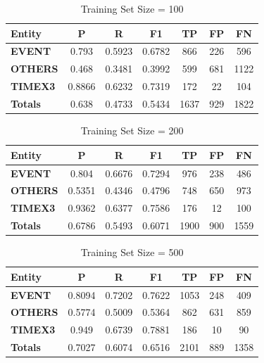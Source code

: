 \documentclass[letterpaper, 10 pt, conference]{ieeeconf}
\begin{document}
\begin{table}[!htpb]
\centering
\caption{Training Set Size = 100}
\label{t3}
\begin{tabular}{lcccccc}
\textbf{Entity} & \textbf{P} & \textbf{R} & \textbf{F1} & \textbf{TP} & \textbf{FP} & \textbf{FN} \\
\hline
\textbf{EVENT}  & 0.793      & 0.5923     & 0.6782      & 866         & 226         & 596         \\
\textbf{OTHERS} & 0.468      & 0.3481     & 0.3992      & 599         & 681         & 1122        \\
\textbf{TIMEX3} & 0.8866     & 0.6232     & 0.7319      & 172         & 22          & 104         \\
\textbf{Totals} & 0.638      & 0.4733     & 0.5434      & 1637        & 929         & 1822       
\end{tabular}
\end{table}

\begin{table}[!htpb]
\centering
\caption{Training Set Size = 200}
\label{t4}
\begin{tabular}{lcccccc}
\textbf{Entity} & \textbf{P} & \textbf{R} & \textbf{F1} & \textbf{TP} & \textbf{FP} & \textbf{FN} \\
\hline
\textbf{EVENT}  & 0.804      & 0.6676     & 0.7294      & 976         & 238         & 486         \\
\textbf{OTHERS} & 0.5351     & 0.4346     & 0.4796      & 748         & 650         & 973         \\
\textbf{TIMEX3} & 0.9362     & 0.6377     & 0.7586      & 176         & 12          & 100         \\
\textbf{Totals} & 0.6786     & 0.5493     & 0.6071      & 1900        & 900         & 1559       
\end{tabular}
\end{table}

\begin{table}[!htpb]
\centering
\caption{Training Set Size = 500}
\label{t5}
\begin{tabular}{lcccccc}
\textbf{Entity} & \textbf{P} & \textbf{R} & \textbf{F1} & \textbf{TP} & \textbf{FP} & \textbf{FN} \\
\hline
\textbf{EVENT}  & 0.8094     & 0.7202     & 0.7622      & 1053        & 248         & 409         \\
\textbf{OTHERS} & 0.5774     & 0.5009     & 0.5364      & 862         & 631         & 859         \\
\textbf{TIMEX3} & 0.949      & 0.6739     & 0.7881      & 186         & 10          & 90          \\
\textbf{Totals} & 0.7027     & 0.6074     & 0.6516      & 2101        & 889         & 1358       
\end{tabular}
\end{table}
\end{document}
